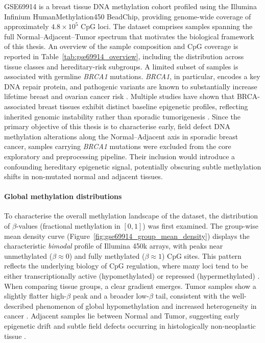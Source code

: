 GSE69914 is a breast tissue DNA methylation cohort profiled using the Illumina Infinium HumanMethylation450 BeadChip, providing genome-wide coverage of approximately $4.8\times10^5$ CpG loci. The dataset comprises samples spanning the full Normal--Adjacent--Tumor spectrum that motivates the biological framework of this thesis.
An overview of the sample composition and CpG coverage is reported in Table~\ref{tab:gse69914_overview}, including the distribution across tissue classes and hereditary-risk subgroups.
A limited subset of samples is associated with germline \textit{BRCA1} mutations. \textit{BRCA1}, in particular, encodes a key DNA repair protein, and pathogenic variants are known to substantially increase lifetime breast and ovarian cancer risk \cite{brca_factsheet}. Multiple studies have shown that BRCA-associated breast tissues exhibit distinct baseline epigenetic profiles, reflecting inherited genomic instability rather than sporadic tumorigenesis \cite{Suijkerbuijk2008, Bartlett2022}.
Since the primary objective of this thesis is to characterise early, field defect DNA methylation alterations along the Normal--Adjacent axis in sporadic breast cancer, samples carrying \textit{BRCA1} mutations were excluded from the core exploratory and preprocessing pipeline. Their inclusion would introduce a confounding hereditary epigenetic signal, potentially obscuring subtle methylation shifts in non-mutated normal and adjacent tissues.





\paragraph{Global methylation distributions}
\label{par:gse69914_global_meth}

To characterise the overall methylation landscape of the dataset, the distribution of $\beta$-values
(fractional methylation in $[0,1]$) was first examined.
The group-wise mean density curve (Figure~\ref{fig:gse69914_group_mean_density}) displays the
characteristic \emph{bimodal} profile of Illumina 450k arrays, with peaks near unmethylated
($\beta \approx 0$) and fully methylated ($\beta \approx 1$) CpG sites. This pattern reflects
the underlying biology of CpG regulation, where many loci tend to be either transcriptionally
active (hypomethylated) or repressed (hypermethylated) \cite{bird2002, maksimovic2012}.
When comparing tissue groups, a clear gradient emerges.
Tumor samples show a slightly flatter high-$\beta$ peak and a broader low-$\beta$ tail,
consistent with the well-described phenomenon of global hypomethylation and increased
heterogeneity in cancer \cite{ehrlich2002}. Adjacent samples lie between Normal and
Tumor, suggesting early epigenetic drift and subtle field defects occurring in histologically
non-neoplastic tissue \cite{Teschendorff2016}.

